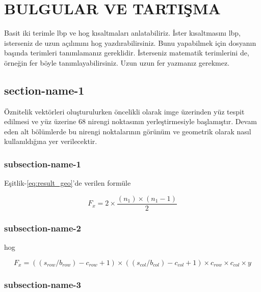 \chapter{BULGULAR VE TARTIŞMA}

Basit iki terimle \acrfull{lbp} ve \acrfull{hog} kısaltmaları anlatabiliriz. İster kısaltmasını \acrshort{lbp}, isterseniz de uzun açılımını \acrlong{hog} yazdırabilirsiniz. Bunu yapabilmek için dosyanın başında terimleri tanımlamanız gereklidir. İsterseniz matematik terimlerini de, örneğin \acrshort{fer} böyle tanımlayabilirsiniz. Uzun uzun \acrfull{fer} yazmanız gerekmez. 

\lipsum[19-25]

\section{section-name-1}

Öznitelik vektörleri oluşturulurken öncelikli olarak imge üzerinden yüz tespit edilmesi ve yüz üzerine 68 nirengi noktasının yerleştirmesiyle başlamıştır. Devam eden alt bölümlerde bu nirengi noktalarının görünüm ve geometrik olarak nasıl kullanıldığına yer verilecektir.

\subsection{subsection-name-1}

Eşitlik-\ref{eq:result_geo}’de verilen formüle 
\lipsum[2]


\begin{equation}
F_{x } =2 \times \frac{(n_{1})\times(n_{1}-1)}{2}  
\label{eq:result_geo}%
\end{equation}

\subsection{subsection-name-2}

\acrfull{hog} 
\lipsum[30]

\begin{equation}
F_{ x } = ((s_{row}/b_{row}) - c_{row} +1) \times ((s_{col} / b_{col}) - c_{col} +1) \times c_{row} \times c_{col} \times y
\label{eq:result_hog}%
\end{equation}


\subsection{subsection-name-3}

